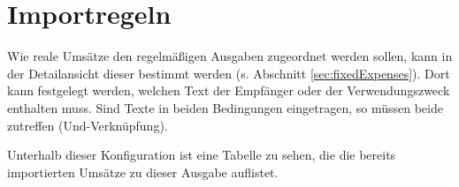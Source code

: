 \section{Importregeln}

Wie reale Umsätze den regelmäßigen Ausgaben zugeordnet werden sollen, kann in der Detailansicht dieser bestimmt werden (s. Abschnitt \ref{sec:fixedExpenses}). Dort kann festgelegt werden, welchen Text der Empfänger oder der Verwendungszweck enthalten muss. Sind Texte in beiden Bedingungen eingetragen, so müssen beide zutreffen (Und-Verknüpfung). 

Unterhalb dieser Konfiguration ist eine Tabelle zu sehen, die die bereits importierten Umsätze zu dieser Ausgabe auflistet. 